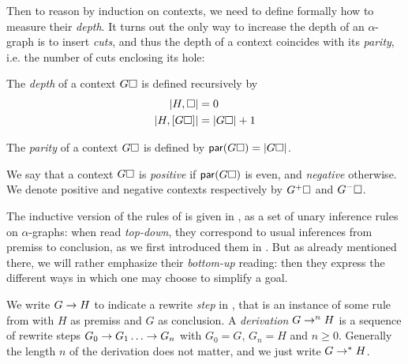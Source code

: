 Then to reason by induction on contexts, we need to define formally how to
measure their \emph{depth}. It turns out the only way to increase the depth of
an $\alpha$-graph is to insert \emph{cuts}, and thus the depth of a context
coincides with its \emph{parity}, i.e. the number of cuts enclosing its hole:

\begin{definition}[Depth]
  The \emph{depth} of a context $G\square$ is defined recursively by
  \begin{align*}
    \left|H, \square\right| &= 0 \\
    \left|H, [G\square]\right| &= \left|G\square\right| + 1
  \end{align*}
\end{definition}

\begin{definition}[Parity]
  The \emph{parity} of a context $G\square$ is defined by $\mathsf{par}(G\square) =
  \left|G\square\right|$.
\end{definition}

\begin{definition}[Polarity]
  We say that a context $G\square$ is \emph{positive} if $\mathsf{par}(G\square)$ is
  even, and \emph{negative} otherwise. We denote positive and negative contexts
  respectively by $G^+\square$ and $G^-\square$.
\end{definition}

The inductive version of the rules of  is given in , as
a set of unary inference rules on $\alpha$-graphs: when read \emph{top-down},
they correspond to usual inferences from premiss to conclusion, as we first
introduced them in .
But as already mentioned there, we will rather emphasize their \emph{bottom-up}
reading: then they express the different ways in which one may choose to
simplify a goal.

\begin{definition}[Derivation]
  We write $G \rightarrow H$ to indicate a rewrite \emph{step} in , that is
  an instance of some rule from  with $H$ as premiss and $G$ as
  conclusion. A \emph{derivation} $G \rightarrow^{n} H$ is a sequence of rewrite
  steps $G_0 \rightarrow G_1 \ldots \rightarrow G_n$ with $G_0 = G$, $G_n = H$ and $n \geq
  0$. Generally the length $n$ of the derivation does not matter, and we just
  write $G \rightarrow^\ast H$.
\end{definition}

